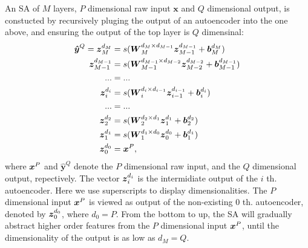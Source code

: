 An SA of $M$ layers, $P$ dimensional raw input $\boldsymbol{x}$ and $Q$ dimensional output, is constucted by recursively pluging the output of an autoencoder into the one above, and ensuring the output of the top layer is $Q$ dimensinal:
\begin{equation} \label{eq:SA}
  \begin{split}
    \boldsymbol{\hat{y}}^Q        =
    \boldsymbol{z}_{M  }^{d_{M  }}         &= s(\boldsymbol{W}_{M  }^{d_{M  } \times d_{M-1}} \boldsymbol{z}_{M-1}^{d_{M-1}} + \boldsymbol{b}_{M  }^{d_{M  }}) \\
    \boldsymbol{z}_{M-1}^{d_{M-1}}         &= s(\boldsymbol{W}_{M-1}^{d_{M-1} \times d_{M-2}} \boldsymbol{z}_{M-2}^{d_{M-2}} + \boldsymbol{b}_{M-1}^{d_{M-1}}) \\
    ... &= ... \\
    \boldsymbol{z}_{i  }^{d_{i  }}         &= s(\boldsymbol{W}_{i  }^{d_{i  } \times d_{i-1}} \boldsymbol{z}_{i-1}^{d_{i-1}} + \boldsymbol{b}_{i  }^{d_{i  }}) \\
    ... &= ... \\
    \boldsymbol{z}_{2  }^{d_{2  }}         &= s(\boldsymbol{W}_{2  }^{d_{2  } \times d_{1  }} \boldsymbol{z}_{1  }^{d_{1  }} + \boldsymbol{b}_{2  }^{d_{2  }}) \\
    \boldsymbol{z}_{1  }^{d_{1  }}         &= s(\boldsymbol{W}_{1  }^{d_{1  } \times d_{0  }} \boldsymbol{z}_{0  }^{d_{0  }} + \boldsymbol{b}_{1  }^{d_{1  }}) \\
    \boldsymbol{z}_{0  }^{d_{0  }}         &= \boldsymbol{x}^P,
  \end{split}
\end{equation}
where $\boldsymbol{x}^P$ and $\boldsymbol{\hat{y}}^Q$ denote the $P$ dimensional raw input, and the $Q$ dimensional output, repectively. The vector $\boldsymbol{z}_i^{d_i}$ is the intermidiate output of the $i$ th. autoencoder. Here we use superscripts to display dimensionalities. The $P$ dimensional input $\boldsymbol{x}^P$ is viewed as output of the non-existing $0$ th. autoencoder, denoted by $\boldsymbol{z}_0^{d_0}$, where $d_0=P$. From the bottom to up, the SA will gradually abstract higher order features from the $P$ dimensional input $\boldsymbol{x}^P$, until the dimensionality of the output is as low as $d_M=Q$.

